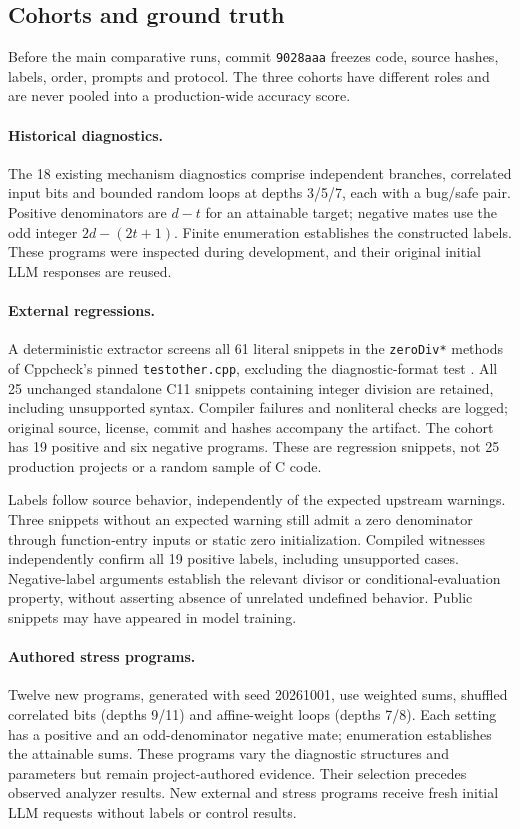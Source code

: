 \documentclass[sigconf]{acmart}
\begin{document}
\subsection{Cohorts and ground truth}
Before the main comparative runs, commit \texttt{9028aaa} freezes code,
source hashes, labels, order, prompts and protocol. The three cohorts have
different roles and are never pooled into a production-wide accuracy score.

\paragraph{Historical diagnostics.}
The 18 existing mechanism diagnostics comprise independent branches,
correlated input bits and bounded random loops at depths 3/5/7, each with
a bug/safe pair. Positive denominators are $d-t$ for an attainable target;
negative mates use the odd integer $2d-(2t+1)$. Finite enumeration establishes
the constructed labels. These programs were inspected during development,
and their original initial LLM responses are reused.

\paragraph{External regressions.}
A deterministic extractor screens all 61 literal snippets in the
\texttt{zeroDiv*} methods of Cppcheck's pinned \texttt{testother.cpp}, excluding
the diagnostic-format test \cite{cppcheck-tests}. All 25 unchanged standalone
C11 snippets containing integer division are retained, including unsupported
syntax. Compiler failures and nonliteral checks are logged; original source,
license, commit and hashes accompany the artifact. The cohort has 19 positive
and six negative programs. These are regression snippets, not 25 production
projects or a random sample of C code.

Labels follow source behavior, independently of the expected upstream
warnings. Three snippets without an expected warning still admit a zero
denominator through function-entry inputs or static zero initialization.
Compiled witnesses independently confirm all 19 positive labels, including
unsupported cases. Negative-label arguments establish the relevant divisor
or conditional-evaluation property, without asserting absence of unrelated
undefined behavior. Public snippets may have appeared in model training.

\paragraph{Authored stress programs.}
Twelve new programs, generated with seed 20261001, use weighted sums,
shuffled correlated bits (depths 9/11) and affine-weight loops (depths 7/8).
Each setting has a positive and an odd-denominator negative mate; enumeration
establishes the attainable sums. These programs vary the diagnostic
structures and parameters but remain project-authored evidence. Their
selection precedes observed analyzer results. New external and stress
programs receive fresh initial LLM requests without labels or control results.
\end{document}
